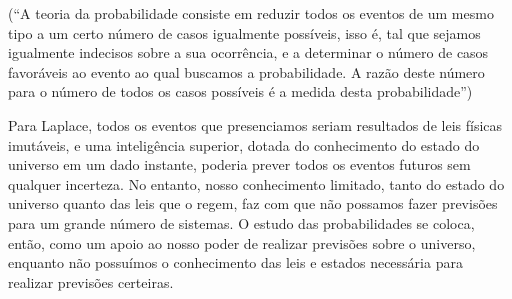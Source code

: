 (``A teoria da probabilidade consiste em reduzir todos os eventos de um mesmo tipo a um certo número de casos igualmente
possíveis, isso é, tal que sejamos igualmente indecisos sobre a sua ocorrência, e a determinar o número de casos
favoráveis ao evento ao qual buscamos a probabilidade. A razão deste número para o número de todos os casos possíveis
é a medida desta probabilidade'')

Para Laplace, todos os eventos que presenciamos seriam resultados de leis físicas
imutáveis, e uma inteligência superior, dotada do conhecimento do estado do universo em um dado instante, poderia prever
todos os eventos futuros sem qualquer incerteza. No entanto, nosso conhecimento limitado, tanto do estado do universo
quanto das leis que o regem, faz com que não possamos fazer previsões para um grande número de sistemas. O estudo das 
probabilidades se coloca, então, como um apoio ao nosso poder de realizar previsões sobre o universo, 
enquanto não possuímos o conhecimento das leis e estados necessária para realizar previsões certeiras. 

